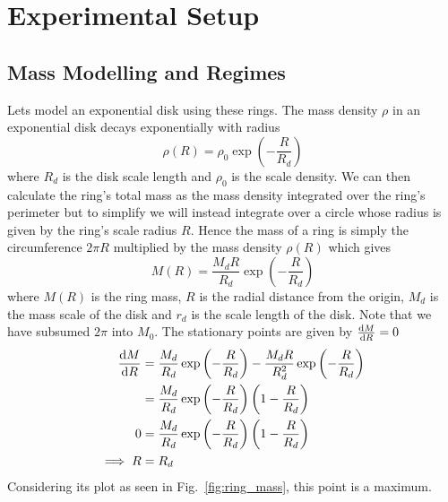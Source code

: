 \section{Experimental Setup}
\subsection{Mass Modelling and Regimes}
Lets model an exponential disk using these rings. The mass density \( \rho \) in an exponential disk decays exponentially with
radius
\begin{equation}
    \rho(R) = \rho_0 \exp\left(-\frac{R}{R_d}\right) \label{eq:exponential_disk_density}
\end{equation}
where \( R_d \) is the disk scale length and \( \rho_0 \) is the scale density. We can then calculate the ring's total mass
as the mass density integrated over the ring's perimeter but to simplify we will instead integrate over a circle whose radius is
given by the ring's scale radius \( R \).
Hence the mass of a ring is simply the circumference \( 2\pi R \) multiplied by the mass density \( \rho(R) \) which gives
\begin{equation}
    M(R) = \frac{M_{d}R}{R_d} \exp\left(-\frac{R}{R_d}\right)\label{eq:ring_mass}
\end{equation}
where \( M(R) \) is the ring mass, \( R \) is the radial distance from the origin, \( M_{d} \) is the mass scale of the disk and
\( r_{d} \) is the scale length of the disk. Note that we have subsumed \( 2\pi \) into \( M_0 \). The stationary points are
given by \( \frac{\textrm{d} M}{\textrm{d} R} = 0 \)
\begin{align}
    \frac{\textrm{d} M}{\textrm{d} R} & = \frac{M_{d}}{R_d} \exp\left(-\frac{R}{R_d}\right) - \frac{M_{d}R}{R_d^2} \exp\left(-\frac{R}{R_d}\right) \nonumber \\
                & = \frac{M_{d}}{R_d} \exp\left(-\frac{R}{R_d}\right)\left(1 - \frac{R}{R_d}\right) \nonumber                          \\
    0           & = \frac{M_{d}}{R_d} \exp\left(-\frac{R}{R_d}\right)\left(1 - \frac{R}{R_d}\right) \nonumber                          \\
    \implies R  & = R_{d}
\end{align}
Considering its plot as seen in Fig.~\ref{fig:ring_mass}, this point is a maximum.

